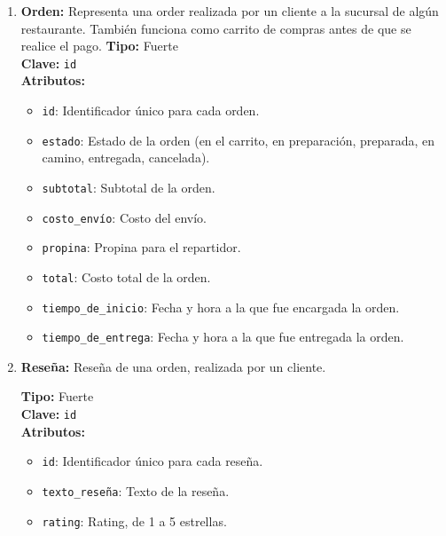 \begin{enumerate}
    \item \textbf{Orden:} Representa una order realizada por un cliente a la sucursal de algún restaurante. También funciona como carrito de compras antes de que se realice el pago.
    \textbf{Tipo:} Fuerte \\
    \textbf{Clave:} \texttt{id} \\
    \textbf{Atributos:}
    \begin{itemize}
        \item \texttt{id}: Identificador único para cada orden.
        \item \texttt{estado}: Estado de la orden (en el carrito, en preparación, preparada, en camino, entregada, cancelada).
        \item \texttt{subtotal}: Subtotal de la orden.
        \item \texttt{costo\_envío}: Costo del envío.
        \item \texttt{propina}: Propina para el repartidor.
        \item \texttt{total}: Costo total de la orden.
        \item \texttt{tiempo\_de\_inicio}: Fecha y hora a la que fue encargada la orden.
        \item \texttt{tiempo\_de\_entrega}: Fecha y hora a la que fue entregada la orden.
    \end{itemize}

    \item \textbf{Reseña:} Reseña de una orden, realizada por un cliente.
    
    \textbf{Tipo:} Fuerte \\
    \textbf{Clave:} \texttt{id} \\
    \textbf{Atributos:}
    \begin{itemize}
        \item \texttt{id}: Identificador único para cada reseña.
        \item \texttt{texto\_reseña}: Texto de la reseña.
        \item \texttt{rating}: Rating, de 1 a 5 estrellas.
    \end{itemize}
\end{enumerate}

